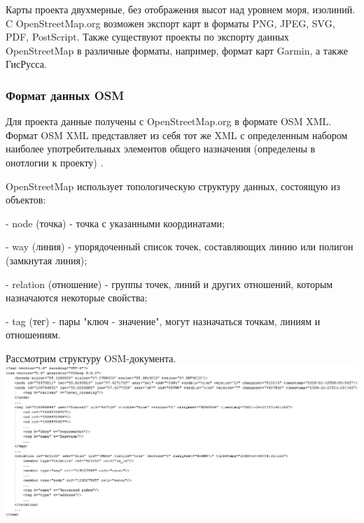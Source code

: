\documentclass[12pt,a4paper,oneside]{article} %
\begin{document}
Карты проекта двухмерные, без отображения высот над уровнем моря, \linebreak
изолиний. C OpenStreetMap.org возможен экспорт карт в форматы PNG, \linebreak
JPEG, SVG, PDF, PostScript. Также существуют проекты по экспорту \linebreak
данных OpenStreetMap в различные форматы, например, формат карт \linebreak
Garmin, а также ГисРусса.

\subsubsection{Формат данных OSM}

Для проекта данные получены с OpenStreetMap.org в формате OSM XML.\linebreak
Формат OSM XML представляет из себя тот же XML с определенным\linebreak
набором наиболее употребительных элементов общего назначения\linebreak
(определены в онотлогии к проекту) .

OpenStreetMap использует топологическую структуру данных, \linebreak
состоящую из объектов:

- node (точка) - точка с указанными координатами;

- way (линия) - упорядоченный список точек, составляющих линию \linebreak
или полигон (замкнутая линия);

- relation (отношение) - группы точек, линий и других отношений, \linebreak
которым назначаются некоторые свойства;

- tag (тег) - пары "ключ - значение", могут назначаться точкам, линиям и\linebreak 
отношениям.

Рассмотрим структуру OSM-документа.
\\[10pt]
\includegraphics[width=1.1\linewidth]{example_osm}
\end{document}
